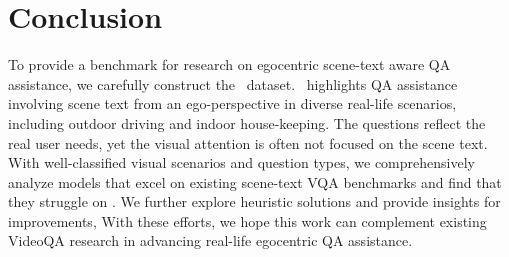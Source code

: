 \section{Conclusion}
To provide a benchmark for research on egocentric scene-text aware QA assistance, we carefully construct the \dataset~dataset. \dataset~highlights QA assistance involving scene text from an ego-perspective in diverse real-life scenarios, including outdoor driving and indoor house-keeping. The questions reflect the real user needs, yet the visual attention is often not focused on the scene text. With well-classified visual scenarios and question types, we comprehensively analyze models that excel on existing scene-text VQA benchmarks and find that they struggle on \dataset. We further explore heuristic solutions and provide insights for improvements,
With these efforts, we hope this work can complement existing VideoQA research in advancing real-life egocentric QA assistance.

